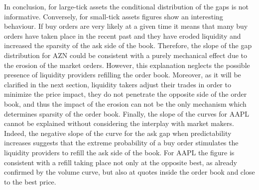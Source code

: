 \documentclass[12pt]{iopart}
\begin{document}
In conclusion, for large-tick assets the conditional distribution of the gaps is not informative. Conversely, for small-tick assets figures show an interesting behaviour. If buy orders are very likely at a given time it means that many buy orders have taken place in the recent past and they have eroded liquidity and increased the sparsity of the ask side of the book. Therefore, the slope of the gap distribution for AZN could be consistent with a purely mechanical effect due to the erosion of the market orders. However, this explanation neglects the possible presence of liquidity providers refilling the order book. Moreover, as it will be clarified in the next section, liquidity takers adjust their trades in order to minimize the price impact, they do not penetrate the opposite side of the order book, and thus the impact of the erosion can not be the only mechanism which determines sparsity of the order book. Finally, the slope of the curves for AAPL cannot be explained without considering the interplay with market makers. Indeed, the negative slope of the curve for the ask gap when predictability increases suggests that the extreme probability of a buy order stimulates the liquidity providers to refill the ask side of the book. For AAPL the figure is consistent with a refill taking place not only at the opposite best, as already confirmed by the volume curve, but also at quotes inside the order book and close to the best price.    
\end{document}

